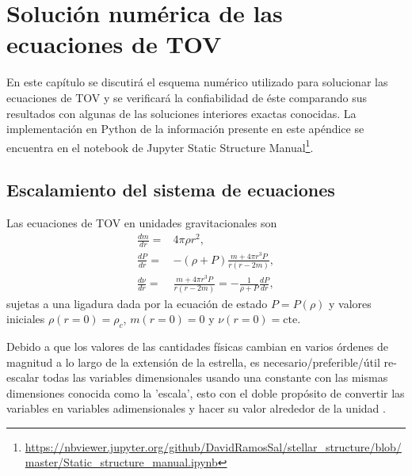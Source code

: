 \chapter{Solución numérica de las ecuaciones de TOV}\label{NumSol}
\noindent En este capítulo se discutirá el esquema numérico utilizado para solucionar las ecuaciones de TOV y se verificará la confiabilidad de éste comparando sus resultados con algunas de las soluciones interiores exactas conocidas.
La implementación en Python de la información presente en este apéndice se encuentra en el notebook de Jupyter Static Structure Manual\footnote{\url{https://nbviewer.jupyter.org/github/DavidRamosSal/stellar_structure/blob/master/Static_structure_manual.ipynb}}.

\section{Escalamiento del sistema de ecuaciones}
\noindent Las ecuaciones de TOV en unidades gravitacionales son
\begin{align}
    \frac{dm}{dr}=&4\pi \rho r^2 ,\\
    \frac{dP}{dr}=&-(\rho+P)\frac{m+4\pi r^3 P}{r(r-2m)} , \\
    \frac{d\nu}{dr}=& \frac{m+4\pi r^3 P}{r(r-2m)} =  -\frac{1}{\rho+P}\frac{dP}{dr},
\end{align}
sujetas a una ligadura dada por la ecuación de estado $P=P(\rho)$ y valores iniciales $\rho(r=0)=\rho_c$, $m(r=0)=0$ y $\nu(r=0)=\text{cte}$.

Debido a que los valores de las cantidades físicas cambian en varios órdenes de magnitud a lo largo de la extensión de la estrella, es necesario/preferible/útil re-escalar todas las variables dimensionales usando una constante con las mismas dimensiones conocida como la 'escala', esto con el doble propósito de convertir las variables en variables adimensionales y hacer su valor alrededor de la unidad \cite{Langtangen2016}.

